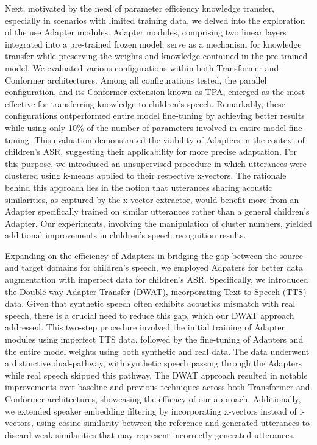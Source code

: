 Next, motivated by the need of parameter efficiency knowledge transfer, especially in scenarios with limited training data, we delved into the exploration of the use Adapter modules. Adapter modules, comprising two linear layers integrated into a pre-trained frozen model, serve as a mechanism for knowledge transfer while preserving the weights and knowledge contained in the pre-trained model. We evaluated various configurations within both Transformer and Conformer architectures. Among all configurations tested, the parallel configuration, and its Conformer extension known as TPA, emerged as the most effective for transferring knowledge to children's speech. Remarkably, these configurations outperformed entire model fine-tuning by achieving better results while using only 10\% of the number of parameters involved in entire model fine-tuning. This evaluation demonstrated the viability of Adapters in the context of children's ASR, suggesting their applicability for more precise adaptation. For this purpose, we introduced an unsupervised procedure in which utterances were clustered using k-means applied to their respective x-vectors. The rationale behind this approach lies in the notion that utterances sharing acoustic similarities, as captured by the x-vector extractor, would benefit more from an Adapter specifically trained on similar utterances rather than a general children's Adapter. Our experiments, involving the manipulation of cluster numbers, yielded additional improvements in children's speech recognition results.

Expanding on the efficiency of Adapters in bridging the gap between the source and target domains for children's speech, we employed Adpaters for better data augmentation with imperfect data for children's ASR. Specifically, we introduced the Double-way Adapter Transfer (DWAT), incorporating Text-to-Speech (TTS) data. Given that synthetic speech often exhibits acoustics mismatch with real speech, there is a crucial need to reduce this gap, which our DWAT approach addressed. This two-step procedure involved the initial training of Adapter modules using imperfect TTS data, followed by the fine-tuning of Adapters and the entire model weights using both synthetic and real data. The data underwent a distinctive dual-pathway, with synthetic speech passing through the Adapters while real speech skipped this pathway. The DWAT approach resulted in notable improvements over baseline and previous techniques across both Transformer and Conformer architectures, showcasing the efficacy of our approach. Additionally, we extended speaker embedding filtering by incorporating x-vectors instead of i-vectors, using cosine similarity between the reference and generated utterances to discard weak similarities that may represent incorrectly generated utterances.

